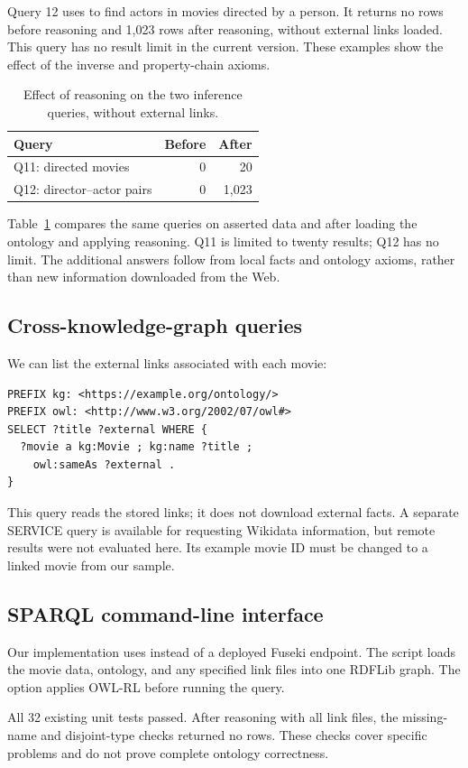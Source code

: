 Query 12 uses  to find actors in movies directed by a person. It returns no rows before reasoning and 1,023 rows after reasoning, without external links loaded. This query has no result limit in the current version. These examples show the effect of the inverse and property-chain axioms.


\begin{table}[t]
\caption{Effect of reasoning on the two inference queries, without external links.}
\label{tab:inference-results}
\centering\small
\begin{tabularx}{\columnwidth}{@{}Xrr@{}}
\toprule Query & Before & After\\\midrule
Q11: directed movies & 0 & 20\\
Q12: director--actor pairs & 0 & 1,023\\
\bottomrule
\end{tabularx}
\end{table}

Table~\ref{tab:inference-results} compares the same queries on asserted data and
after loading the ontology and applying reasoning. Q11 is limited to twenty
results; Q12 has no limit. The additional answers follow from local facts and
ontology axioms, rather than new information downloaded from the Web.

\subsection{Cross-knowledge-graph queries}
We can list the external links associated with each movie:
\begin{lstlisting}
PREFIX kg: <https://example.org/ontology/>
PREFIX owl: <http://www.w3.org/2002/07/owl#>
SELECT ?title ?external WHERE {
  ?movie a kg:Movie ; kg:name ?title ;
    owl:sameAs ?external .
}
\end{lstlisting}
This query reads the stored links; it does not download external facts. A separate SERVICE query is available for requesting Wikidata information, but remote results were not evaluated here. Its example movie ID must be changed to a linked movie from our sample.

\subsection{SPARQL command-line interface}
Our implementation uses  instead of a deployed Fuseki endpoint. The script loads the movie data, ontology, and any specified link files into one RDFLib graph. The  option applies OWL-RL before running the query.

All 32 existing unit tests passed. After reasoning with all link files, the missing-name and disjoint-type checks returned no rows. These checks cover specific problems and do not prove complete ontology correctness.
